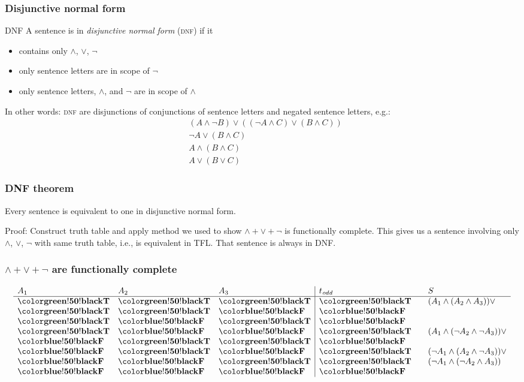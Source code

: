 \begin{frame}
  \frametitle{Disjunctive normal form}

  \begin{block}{DNF}
    A sentence is in \emph{disjunctive normal form} (\textsc{dnf}) if it
    \begin{itemize}
      \item contains only $\land$, $\lor$, $\lnot$
      \item only sentence letters are in scope of $\lnot$
      \item only sentence letters, $\land$, and $\lnot$ are in scope of $\land$
    \end{itemize}
  \end{block}

  In other words: \textsc{dnf} are disjunctions of conjunctions of
  sentence letters and negated sentence letters, e.g.:
  \begin{align*}
  & (A \land \lnot B) \lor ((\lnot A \land C) \lor (B \land C))\\
  & \lnot A \lor (B \land C)\\
  & A \land (B \land C)\\
  & A \lor (B \lor C)
\end{align*}

\end{frame}

\begin{frame}
\frametitle{DNF theorem}

\begin{theorem}
Every sentence is equivalent to one in disjunctive normal form.
\end{theorem}

Proof: Construct truth table and apply method we used to show ${\land}
+ {\lor} + {\lnot}$ is functionally complete. This gives us a sentence
involving only $\land$, $\lor$, $\lnot$ with same truth table, i.e.,
is equivalent in TFL. That sentence is always in DNF.
\end{frame}

\begin{frame}
  \frametitle{$\land + \lor + \lnot$ are functionally complete}
\[
\begin{array}{lll|l@{\qquad}l}
A_1 & A_2 & A_3 & t_\mathit{odd} & S \\
\hline
\True & \True & \True & \True & {(A_1 \land (A_2 \land A_3))} \lor\\
\True & \True & \False & \False \\
\True & \False & \True & \False \\
\True & \False & \False & \True & {(A_1 \land (\lnot A_2 \land \lnot A_3))} \lor\\
\False & \True & \True & \False \\
\False & \True & \False & \True & {(\lnot A_1 \land (A_2 \land \lnot A_3))} \lor\\
\False & \False & \True & \True & {(\lnot A_1 \land (\lnot A_2 \land A_3))}\\
\False & \False & \False & \False
\end{array}\]
\end{frame}


